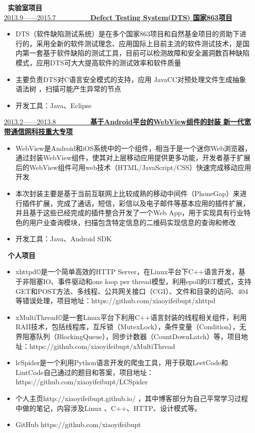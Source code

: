 \documentclass[UTF8, winfonts]{ctexart}
\begin{document}
\noindent \textbf{ \heiti \faUniversity\ 实验室项目}\\
\uline{2013.9——2015.7~~~~~~~~~~\bf{Defect Testing System(DTS)} \hfill \bf{国家863项目}}
\begin{itemize}
  \setlength{\itemsep}{0pt}
  \setlength{\parsep}{3pt}
  \setlength{\parskip}{3pt}
  \item {}DTS（软件缺陷测试系统）是在多个国家863项目和自然基金项目的资助下进行的，采用全新的软件测试理念、应用国际上目前主流的软件测试技术，是国内第一套基于软件缺陷的测试工具，目前可以检测故障和安全漏洞数百种缺陷模式，应用DTS可大大提高软件的测试效率和软件质量
  \item {}主要负责DTS对C语言安全模式的支持，应用 JavaCC对预处理文件生成抽象语法树 ，扫描可能产生异常的节点
  \item {}开发工具：Java、Eclipse
\end{itemize}
\uline{2013.2——2013.8~~~~~~~~~~\bf{基于Android平台的WebView组件的封装} \hfill \bf{新一代宽带通信网科技重大专项}}
\begin{itemize}
  \setlength{\itemsep}{0pt}
  \setlength{\parsep}{3pt}
  \setlength{\parskip}{3pt}
  \item {}WebView是Android和iOS系统中的一个组件，相当于是一个迷你Web浏览器，通过封装WebView组件，使其对上层移动应用提供更多功能，开发者基于扩展后的WebView组件可用web技术（HTML/JavaScript/CSS）快速完成移动应用开发
  \item {}本次封装主要是基于当前互联网上比较成熟的移动中间件（PhoneGap）来进行插件扩展，完成了通话，短信，彩信以及电子邮件等基本应用的插件扩展，并且基于这些已经完成的插件整合开发了一个Web App，用于实现具有行业特色的用户业查询模块，扫描包含特定信息的二维码实现信息的查询和修改
  \item {}开发工具：Java、Android SDK
\end{itemize}
\noindent \textbf{ \heiti \faCode\ 个人项目}
\begin{itemize}
  \setlength{\itemsep}{0pt}
  \setlength{\parsep}{3pt}
  \setlength{\parskip}{3pt}
  \item {}xhttpd©是一个简单高效的HTTP Server，在Linux平台下C++语言开发，基于非阻塞IO、事件驱动和one loop per thread模型，利用epoll的ET模式，支持GET和POST方法、多线程、公共网关接口（CGI）、文件和目录的访问、404等错误处理，项目地址：https://github.com/xiaoyifeibupt/xhttpd
  \item {}xMultiThread©是一套Linux平台下利用C++语言封装的线程相关组件，利用RAII技术，包括线程库，互斥锁（MutexLock），条件变量（Condition），无界阻塞队列（BlockingQueue），同步计数器（CountDownLatch）等，项目地址：https://github.com/xiaoyifeibupt/xMultiThread
  \item {}lcSpider是一个利用Python语言开发的爬虫工具，用于获取LeetCode和LintCode自己通过的题目和答案，项目地址：https://github.com/xiaoyifeibupt/LCSpider
  \item {}个人主页http://xiaoyifeibupt.github.io/ ，其中博客部分为自己平常学习过程中做的笔记，内容涉及Linux 、C++、HTTP、设计模式等。
  \item {}GitHub https://github.com/xiaoyifeibupt
\end{itemize}
\end{document}
